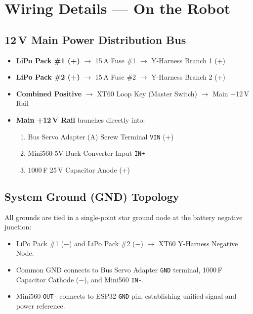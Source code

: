 \documentclass[11pt,a4paper]{article}
\begin{document}
\section{Wiring Details --- On the Robot}

\subsection{12\,V Main Power Distribution Bus}
\begin{itemize}[leftmargin=1.5em, itemsep=0.25em]
    \item \textbf{LiPo Pack \#1 (+)} $\longrightarrow$ 15\,A Fuse \#1 $\longrightarrow$ Y-Harness Branch 1 (+)
    \item \textbf{LiPo Pack \#2 (+)} $\longrightarrow$ 15\,A Fuse \#2 $\longrightarrow$ Y-Harness Branch 2 (+)
    \item \textbf{Combined Positive} $\longrightarrow$ XT60 Loop Key (Master Switch) $\longrightarrow$ Main +12\,V Rail
    \item \textbf{Main +12\,V Rail} branches directly into:
    \begin{enumerate}[leftmargin=1.2em, itemsep=0.1em]
        \item Bus Servo Adapter (A) Screw Terminal \texttt{VIN} (+)
        \item Mini560-5V Buck Converter Input \texttt{IN+}
        \item 1000\,\textmu F 25\,V Capacitor Anode (+)
    \end{enumerate}
\end{itemize}

\subsection{System Ground (GND) Topology}
All grounds are tied in a single-point star ground node at the battery negative junction:
\begin{itemize}[leftmargin=1.5em, itemsep=0.2em]
    \item LiPo Pack \#1 ($-$) and LiPo Pack \#2 ($-$) $\longrightarrow$ XT60 Y-Harness Negative Node.
    \item Common GND connects to Bus Servo Adapter \texttt{GND} terminal, 1000\,\textmu F Capacitor Cathode ($-$), and Mini560 \texttt{IN-}.
    \item Mini560 \texttt{OUT-} connects to ESP32 \texttt{GND} pin, establishing unified signal and power reference.
\end{itemize}
\end{document}
